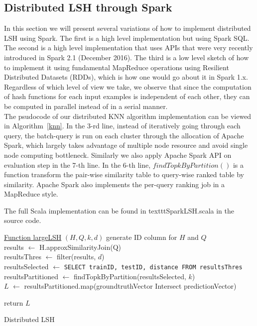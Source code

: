 \documentclass[letterpaper,twocolumn,10pt]{article}
\theoremstyle{definition}
\begin{document}
\subsection{Distributed LSH through Spark}

In this section we will present several variations of how to implement distributed LSH using Spark. The 
first is a high level implementation but using Spark SQL. The second is a high level implementation that 
uses APIs that were very recently introduced in Spark 2.1 (December 2016). The 
third is a low level sketch of how to implement it using fundamental MapReduce operations using 
Resilient Distributed Datasets (RDDs), which is how one would go about it in Spark 1.x. \\

Regardless of which level of view we take, we observe that since the computation of hash functions for 
each input examples is independent of each other, they can be computed in parallel instead of in a 
serial manner. \\

The psudocode of our distributed KNN algorithm implementation can be viewed in Algorithm~\ref{knn}. In the 3-rd line, instead of iteratively going through each query, the batch-query is run on each cluster through the allocation of Apache Spark, which largely takes advantage of multiple node resource and avoid single node computing bottleneck. Similarly we also apply Apache Spark API on evaluation step in the 7-th line.
In the 6-th line, $findTopkByPartition()$ is a function transform the pair-wise similarity table to query-wise ranked table by similarity. Apache Spark also implements the per-query ranking job in a MapReduce style. 
 
The full Scala implementation can be 
found in texttt{SparkLSH.scala} in the source code. \\

\begin{algorithm}[h]
	\underline{Function largeLSH} $(H, Q, k, d)$\;
	generate ID column for $H$ and $Q$ \\
	results $\leftarrow$ H.approxSimilarityJoin(Q)   \\
	resultsThres $\leftarrow$ filter(results, $d$) \\
	resultsSelected $\leftarrow$ \texttt{SELECT trainID, testID, distance FROM resultsThres} \\
	resultsPartitioned $\leftarrow$  findTopkByPartition(resultsSelected, $k$) \\
	$L$ $\leftarrow$ resultsPartitioned.map(groundtruthVector Intersect predictionVector)
	
	return $L$\;
	\caption{Distributed LSH}
	\label{knn}
\end{algorithm}
\end{document}
